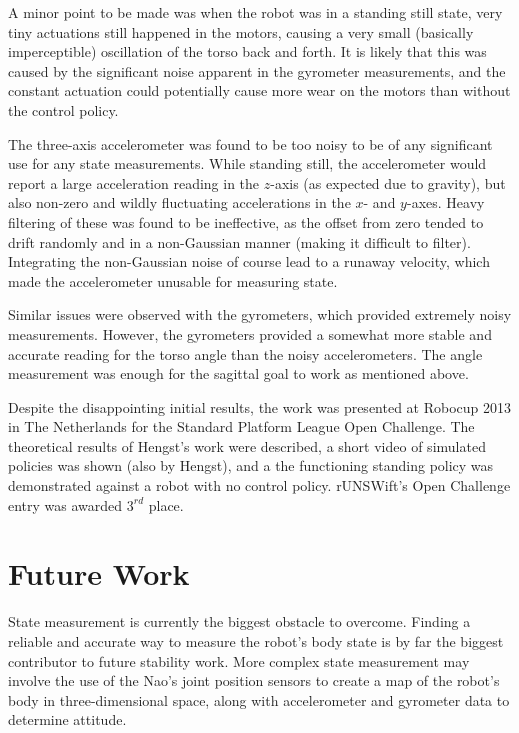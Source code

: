 A minor point to be made was when the robot was in a standing still state, very tiny actuations still happened in the motors, causing a very small (basically imperceptible) oscillation of the torso back and forth. It is likely that this was caused by the significant noise apparent in the gyrometer measurements, and the constant actuation could potentially cause more wear on the motors than without the control policy.

The three-axis accelerometer was found to be too noisy to be of any significant use for any state measurements. While standing still, the accelerometer would report a large acceleration reading in the $z$-axis (as expected due to gravity), but also non-zero and wildly fluctuating accelerations in the $x$- and $y$-axes. Heavy filtering of these was found to be ineffective, as the offset from zero tended to drift randomly and in a non-Gaussian manner (making it difficult to filter). Integrating the non-Gaussian noise of course lead to a runaway velocity, which made the accelerometer unusable for measuring state.

Similar issues were observed with the gyrometers, which provided extremely noisy measurements. However, the gyrometers provided a somewhat more stable and accurate reading for the torso angle than the noisy accelerometers. The angle measurement was enough for the sagittal goal to work as mentioned above.

Despite the disappointing initial results, the work was presented at Robocup 2013 in The Netherlands for the Standard Platform League Open Challenge. The theoretical results of Hengst's work\cite{bernhard_rl} were described, a short video of simulated policies was shown (also by Hengst), and a the functioning standing policy was demonstrated against a robot with no control policy. rUNSWift's Open Challenge entry was awarded $3^{rd}$ place.

\newpage
\section{Future Work}

State measurement is currently the biggest obstacle to overcome. Finding a reliable and accurate way to measure the robot's body state is by far the biggest contributor to future stability work. More complex state measurement may involve the use of the Nao's joint position sensors to create a map of the robot's body in three-dimensional space, along with accelerometer and gyrometer data to determine attitude.

